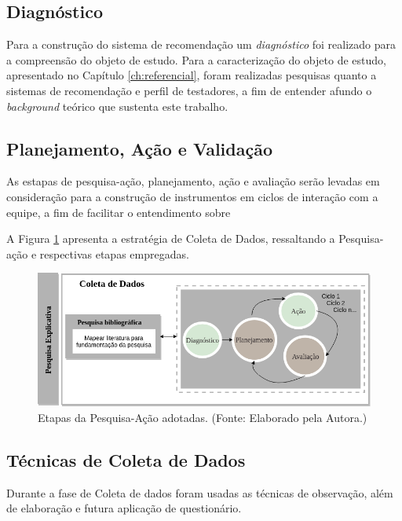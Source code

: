 \subsection{Diagnóstico}

Para a construção do sistema de recomendação um \textit{diagnóstico} foi realizado para a compreensão do objeto de estudo. Para a caracterização do objeto de estudo, apresentado no Capítulo \ref{ch:referencial}, foram realizadas pesquisas quanto a sistemas de recomendação e perfil de testadores, a fim de entender afundo o \textit{background} teórico que sustenta este trabalho.

\subsection{Planejamento, Ação e Validação}

As estapas de pesquisa-ação, planejamento, ação e avaliação serão levadas em consideração para a construção de instrumentos em ciclos de interação com a equipe, a fim de facilitar o entendimento sobre

A Figura \ref{fig:etapasPesquisaAcaoAdotas} apresenta a estratégia de Coleta de Dados, ressaltando a Pesquisa-ação e respectivas etapas empregadas.

        \begin{figure}[H]
          \centering
          \includegraphics[width=12cm]{figuras/etapasPesquisaAcaoAdotadas.png}
          \caption{Etapas da Pesquisa-Ação adotadas. (Fonte: Elaborado pela Autora.)}
          \label{fig:etapasPesquisaAcaoAdotas}

        \end{figure}

\subsection{Técnicas de Coleta de Dados}

Durante a fase de Coleta de dados foram usadas as técnicas de observação, além de elaboração e futura aplicação de questionário.

